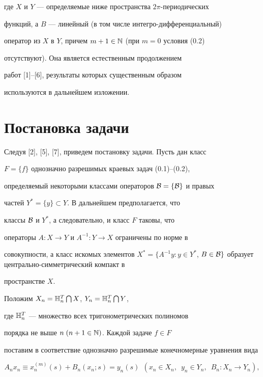 где $X$ и $Y$ --- определяемые ниже пространства $2\pi$-периодических


функций, а $B$ --- линейный (в том числе интегро-дифференциальный)


оператор из $X$ в $Y$, причем $m+1\in \Bbb {N}$ (при $m=0$ условия (0.2)


отсутствуют). Она является естественным продолжением


работ [1]--[6], результаты которых существенным образом


используются в дальнейшем изложении.





\section{Постановка задачи}





Следуя [2], [5], [7], приведем постановку задачи. Пусть дан класс


$F=\{f\}$ однозначно разрешимых краевых задач (0.1)--(0.2),


определяемый некоторыми классами операторов $\cal{B}=\{B\}$ и правых


частей $Y^* = \{y\}\subset Y$. В дальнейшем предполагается, что


классы $\cal{B}$ и $Y^*$, а следовательно, и класс $F$ таковы, что


операторы $A:X\to Y$ и $A^{-1}:Y\to X$ ограничены по норме в


совокупности, а класс искомых элементов $X^* = \{A^{-1}y:y\in


Y^*$, $B\in \rB\}$ образует центрально-симметрический компакт в


пространстве $X$.





Положим $X_n = \Bbb {H}_n^T \bigcap X$, $Y_n = \Bbb {H}_n^T \bigcap Y$,


где $\Bbb {H}_n^T$ --- множество всех тригонометрических полиномов


порядка не выше $n\; (n+1\in\Bbb {N})$. Каждой задаче $f\in F$ 


поставим в соответствие однозначно разрешимые конечномерные уравнения вида


\begin{equation}


A_n x_n \equiv x_n^{(m)}(s) + B_n(x_n;s) = y_n(s)\ \ (x_n\in X_n,\ \;


y_n\in Y_n,\ \; B_n:X_n\to Y_n),


\end{equation}


